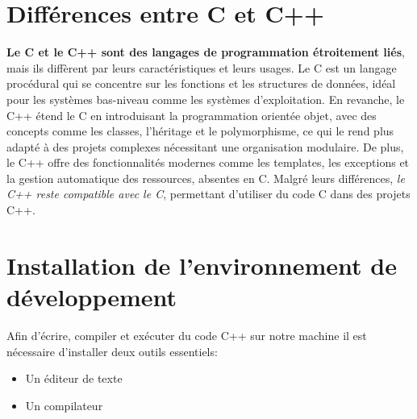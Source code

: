 \section{Différences entre C et C++}
\textbf{Le C et le C++ sont des langages de programmation étroitement liés}, mais ils diffèrent par leurs caractéristiques et leurs usages. Le C est un langage procédural qui se concentre sur les fonctions et les structures de données, idéal pour les systèmes bas-niveau comme les systèmes d'exploitation. En revanche, le C++ étend le C en introduisant la programmation orientée objet, avec des concepts comme les classes, l'héritage et le polymorphisme, ce qui le rend plus adapté à des projets complexes nécessitant une organisation modulaire. De plus, le C++ offre des fonctionnalités modernes comme les templates, les exceptions et la gestion automatique des ressources, absentes en C. Malgré leurs différences, \emph{le C++ reste compatible avec le C}, permettant d'utiliser du code C dans des projets C++.

\section{Installation de l'environnement de développement}
Afin d'écrire, compiler et exécuter du code C++ sur notre machine il est nécessaire d'installer deux outils essentiels:
\begin{itemize}
	\item Un éditeur de texte
	\item Un compilateur
\end{itemize}